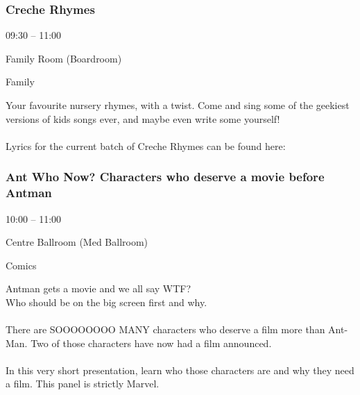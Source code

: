 \documentclass{scrreprt}
\begin{document}
\begin{multicols}{2}
\subsubsection*{Creche Rhymes}\begin{description}
\setlength{\itemsep}{0pt}
\setlength{\parsep}{0pt}
\setlength{\parskip}{0pt}
\item[Time:]{09:30 -- 11:00}
\item[Venue:]{Family Room (Boardroom)}
\item[Tags:]{Family}\end{description}
Your favourite nursery rhymes, with a twist. Come and sing some of the geekiest versions of kids songs ever, and maybe even write some yourself!\\\\Lyrics for the current batch of Creche Rhymes can be found here:
\subsubsection*{Ant Who Now? Characters who deserve a movie before Antman}\begin{description}
\setlength{\itemsep}{0pt}
\setlength{\parsep}{0pt}
\setlength{\parskip}{0pt}
\item[Time:]{10:00 -- 11:00}
\item[Venue:]{Centre Ballroom (Med Ballroom)}
\item[Tags:]{Comics}\end{description}
Antman gets a movie and we all say WTF?\\Who should be on the big screen first and why.\\\\There are SOOOOOOOO MANY characters who deserve a film more than Ant-Man. Two of those characters have now had a film announced. \\\\In this very short presentation, learn who those characters are and why they need a film. This panel is strictly Marvel.

\end{multicols}
\end{document}
